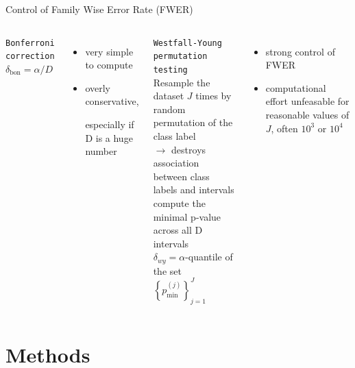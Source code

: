 \documentclass[aspectratio=32, 10pt]{beamer}
\begin{document}
\begin{frame}{Control of Family Wise Error Rate (FWER)}
\begin{columns}[T,onlytextwidth]
\texttt{Bonferroni correction}\\
\vspace{12pt}
$\delta_{\text{bon}} = \alpha /D$\\ 
\begin{itemize}
    \item very simple to compute
    \item overly conservative,
    
    especially if D is a huge number
\end{itemize}

\texttt{Westfall-Young permutation testing} \\
\vspace{12pt}
Resample the dataset $J$ times by random permutation of the class label \\
$\to$ destroys association between class labels and intervals\\
compute the minimal p-value across all D intervals \\
$\delta_{wy} = \alpha$-quantile of the set $\left\{ p_{\text{min}}^{(j)} \right\}_{j=1}^J$
\begin{itemize}
    \item strong control of FWER
    \item computational effort unfeasable for reasonable values of $J$, often $10^3$ or $10^4$
\end{itemize}
\end{columns}
    
\end{frame}
\section{Methods}
\end{document}

